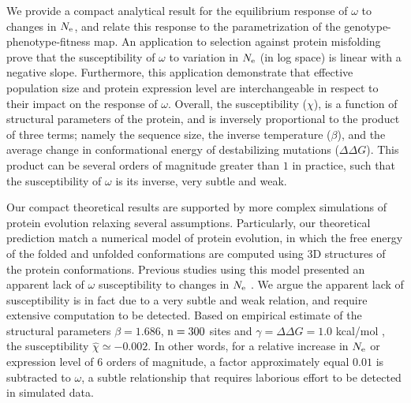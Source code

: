 \documentclass{MBE}%
\begin{document}
We provide a compact analytical result for the equilibrium response of $\omega$ to changes in $N_{\mathrm{e}}$, and relate this response to the parametrization of the genotype-phenotype-fitness map.
An application to selection against protein misfolding prove that the susceptibility of $\omega$ to variation in $N_{\mathrm{e}}$ (in log space) is linear with a negative slope.
Furthermore, this application demonstrate that effective population size and protein expression level are interchangeable in respect to their impact on the response of $\omega$.
Overall, the susceptibility ($\chi$), is a function of structural parameters of the protein, and is inversely proportional to the product of three terms; namely the sequence size, the inverse temperature ($\beta$), and the average change in conformational energy of destabilizing mutations ($\Delta \Delta G$). 
This product can be several orders of magnitude greater than $1$ in practice, such that the susceptibility of $\omega$ is its inverse, very subtle and weak. 


Our compact theoretical results are supported by more complex simulations of protein evolution relaxing several assumptions.
Particularly, our theoretical prediction match a numerical model of protein evolution, in which the free energy of the folded and unfolded conformations are computed using $3$D structures of the protein conformations.
Previous studies using this model presented an apparent lack of $\omega$ susceptibility to changes in $N_{\mathrm{e}}$ \citep{Goldstein2013}.
We argue the apparent lack of susceptibility is in fact due to a very subtle and weak relation, and require extensive computation to be detected.
Based on empirical estimate of the structural parameters $\beta = 1.686$, $\text{n}=300$ sites and $\gamma=\Delta \Delta G = 1.0$ kcal/mol \citep{Zeldovich2007}, the susceptibility $\hat{\chi} \simeq -0.002$.
In other words, for a relative increase in $N_{\mathrm{e}}$ or expression level of $6$ orders of magnitude, a factor approximately equal $0.01$ is subtracted to $\omega$, a subtle relationship that requires laborious effort to be detected in simulated data.
\end{document}
